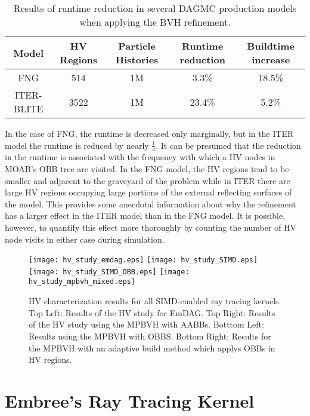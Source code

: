 \begin{table}[H]
  \centering
  \begin{tabular}{c c c c c}
    \toprule
    \textbf{Model} & \textbf{HV Regions} & \textbf{Particle Histories} & \textbf{Runtime reduction} & \textbf{Buildtime increase} \\
    \hline
    FNG            & 514                 & 1M                          & 3.3\%                      & 18.5\%                      \\
    ITER-BLITE     & 3522                & 1M                          & 23.4\%                     & 5.2\%                       \\
    \bottomrule
  \end{tabular}
  \caption{Results of runtime reduction in several DAGMC production models when applying the BVH refinement.}
  \label{tab:bvhrefine_production_results}
\end{table}    

In the case of FNG, the runtime is decreased only marginally, but in the ITER
model the runtime is reduced by nearly $\frac{1}{4}$. It can be presumed that
the reduction in the runtime is associated with the frequency with which a HV
nodes in MOAB's OBB tree are visited. In the FNG model, the HV regions tend to
be smaller and adjacent to the graveyard of the problem while in ITER there are
large HV regions occupying large portions of the external reflecting surfaces of
the model. This provides some anecdotal information about why the refinement has
a larger effect in the ITER model than in the FNG model. It is possible,
however, to quantify this effect more thoroughly by counting the number of HV
node visits in either case during simulation.

\begin{sidewaysfigure}
  \centering
  \texttt{[image: hv\_study\_emdag.eps]}
  \texttt{[image: hv\_study\_SIMD.eps]}
  \texttt{[image: hv\_study\_SIMD\_OBB.eps]}
  \texttt{[image: hv\_study\_mpbvh\_mixed.eps]}
  \caption{HV characterization results for all SIMD-enabled ray tracing
    kernels. Top Left: Results of the HV study for EmDAG. Top Right: Results of
    the HV study using the MPBVH with AABBs. Botttom Left: Results using the
    MPBVH with OBBS. Bottom Right: Results for the MPBVH with an adaptive build
    method which applys OBBs in HV regions.}
  \label{fig:simd_hv_studies}
\end{sidewaysfigure}

\section{Embree's Ray Tracing Kernel}\label{sec:emdag_hv_study}

